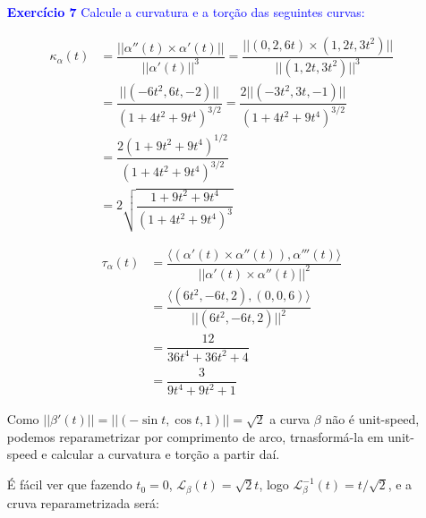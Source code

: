 \documentclass[12pt,letterpaper]{article}
\newcommand\lcur{\mathcal{L}}
\newcommand{\real}{\mathbb{R}}
\newcommand{\ex}[1]{\textcolor{blue}{\textbf{Exercício #1}}}
\newcommand{\blue}[1]{{\color{blue}{#1}}}
\begin{document}
\begin{enumerate}
% 	
	\item[\ex{7}] \textcolor{blue}{Calcule a curvatura e a torção das seguintes curvas:}
		\begin{enumerate}[(a)]
			\blue{
			\item $\alpha(t)=(t,t^2,t^3),t\in\real$}
				\begin{align*}
					\kappa_{\alpha}(t)&=\dfrac{||\alpha''(t)\times\alpha'(t)||}{||\alpha'(t)||^3}
					=\dfrac{||(0,2,6t)\times(1,2t,3t^2)||}{||(1,2t,3t^2)||^3}\\
					&=\dfrac{||(-6 t^2, 6 t, -2)||}{(1+4t^2+9t^4)^{3/2}}
					=\dfrac{2||(-3t^2,3t,-1)||}{(1+4t^2+9t^4)^{3/2}}\\
					&=\dfrac{2(1+9t^2+9t^4)^{1/2}}{(1+4t^2+9t^4)^{3/2}}\\
					&=2\sqrt{\dfrac{1+9t^2+9t^4}{(1+4t^2+9t^4)^3}}
				\end{align*}
			
			
			
			\begin{align*}
				\tau_\alpha(t)&=\dfrac{\langle(\alpha'(t)\times\alpha''(t)),\alpha'''(t)\rangle}{||\alpha'(t)\times\alpha''(t)||^2}\\
				&=\dfrac{\langle(6 t^2, -6 t, 2),(0,0,6)\rangle}{||(6 t^2, -6 t, 2)||^2}\\
				&=\dfrac{12}{36t^4+36t^2+4}\\
				&=\dfrac{3}{9t^4+9t^2+1}
			\end{align*}
		
		\blue{\item $\beta(t)=(\cos t,\sin t,t),t\in\real$}
		
		Como $||\beta'(t)||=||(-\sin t,\cos t,1)||=\sqrt2$ a curva $\beta$ não é unit-speed, podemos reparametrizar por comprimento de arco, trnasformá-la em unit-speed e calcular a curvatura e torção a partir daí. 
		
		É fácil ver que fazendo $t_0=0$, $\lcur_\beta(t)=\sqrt2t$, logo $\lcur^{-1}_\beta(t)=t/\sqrt2$, e a cruva reparametrizada será:
		

\end{enumerate}
\end{enumerate}
\end{document}
